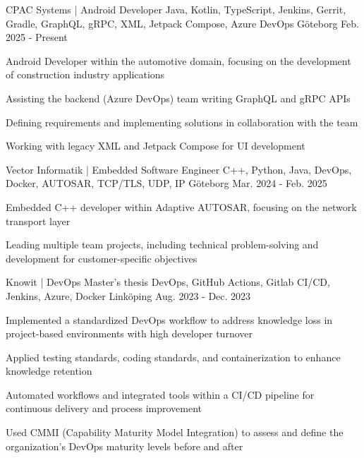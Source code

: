 

\begin{cventries}

	\cventry
	{CPAC Systems | Android Developer} %
	{Java, Kotlin, TypeScript, Jenkins, Gerrit, Gradle, GraphQL, gRPC, XML, Jetpack Compose, Azure DevOps} %
	{Göteborg} %
	{Feb. 2025 - Present} %
	{
		\begin{cvitems} %
			\item {Android Developer within the automotive domain, focusing on the development of construction industry applications}
			\item {Assisting the backend (Azure DevOps) team writing GraphQL and gRPC APIs}
			\item {Defining requirements and implementing solutions in collaboration with the team}
			\item {Working with legacy XML and Jetpack Compose for UI development}
		\end{cvitems}
	}
	\cventry
	{Vector Informatik | Embedded Software Engineer} %
	{C++, Python, Java, DevOps, Docker, AUTOSAR, TCP/TLS, UDP, IP} %
	{Göteborg} %
	{Mar. 2024 - Feb. 2025} %
	{
		\begin{cvitems} %
			\item {Embedded C++ developer within Adaptive AUTOSAR, focusing on the network transport layer}
			\item {Leading multiple team projects, including technical problem-solving and development for customer-specific objectives}
		\end{cvitems}
	}

	\cventry
	{Knowit | DevOps Master's thesis} %
	{DevOps, GitHub Actions, Gitlab CI/CD, Jenkins, Azure, Docker} %
	{Linköping} %
	{Aug. 2023 - Dec. 2023} %
	{
		\begin{cvitems} %
			\item {Implemented a standardized DevOps workflow to address knowledge loss in project-based environments with high developer turnover}
			\item {Applied testing standards, coding standards, and containerization to enhance knowledge retention}
			\item {Automated workflows and integrated tools within a CI/CD pipeline for continuous delivery and process improvement}
			\item {Used CMMI (Capability Maturity Model Integration) to assess and define the organization’s DevOps maturity levels before and after}
		\end{cvitems}
	}


\end{cventries}
